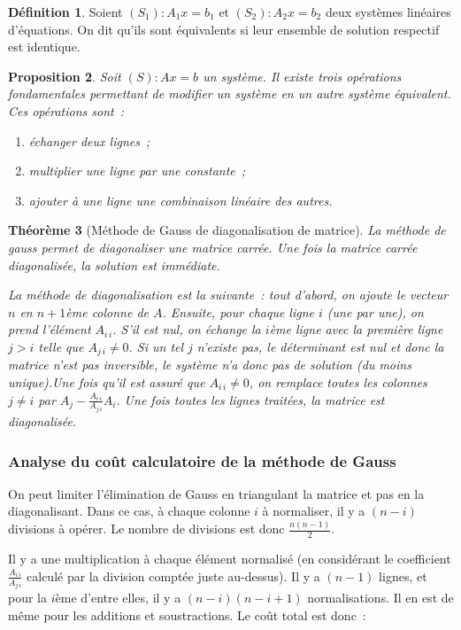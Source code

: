 \documentclass{article}
\newtheorem{thm}{Théorème}[section]
\newtheorem{prp}[thm]{Proposition}
\theoremstyle{definition}
\newtheorem{déf}[thm]{Définition}
\theoremstyle{remark}
\begin{document}
		\begin{déf} Soient $(S_1) : A_1x = b_1$ et $(S_2) : A_2x = b_2$ deux systèmes linéaires d'équations. On dit qu'ils sont équivalents si leur ensemble
		de solution respectif est identique. \end{déf}

		\begin{prp} Soit $(S) : Ax = b$ un système. Il existe trois opérations fondamentales permettant de modifier un système en un autre système équivalent.
		Ces opérations sont~:
		\begin{enumerate}
			\item échanger deux lignes~;
			\item multiplier une ligne par une constante~;
			\item ajouter à une ligne une combinaison linéaire des autres.
		\end{enumerate}
		\end{prp}

		\begin{thm}[Méthode de Gauss de diagonalisation de matrice] La méthode de gauss permet de diagonaliser une matrice carrée. Une fois la matrice carrée
		diagonalisée, la solution est immédiate.

		La méthode de diagonalisation est la suivante~: tout d'abord, on \emph{ajoute} le vecteur $n$ en $n+1$ème colonne de $A$. Ensuite, pour chaque ligne
		$i$ (une par une), on prend l'élément $A_{i\,i}$. S'il est nul, on échange la $i$ème ligne avec la première ligne $j > i$ telle que $A_{j\,i} \neq 0$.
		Si un tel $j$ n'existe pas, le déterminant est nul et donc la matrice n'est pas inversible, le système n'a donc pas de solution (du moins unique).Une
		fois qu'il est assuré que $A_{i\,i} \neq 0$, on remplace toutes les colonnes $j \neq i$ par $A_j - \frac {A_{i\,i}}{A_{j\,i}}A_i$. Une fois toutes les
		lignes traitées, la matrice est diagonalisée.
		\end{thm}

		\subsubsection{Analyse du coût calculatoire de la méthode de Gauss}
		On peut limiter l'élimination de Gauss en triangulant la matrice et pas en la diagonalisant. Dans ce cas, à chaque colonne $i$ à normaliser, il y a
		$(n-i)$ divisions à opérer. Le nombre de divisions est donc $\frac {n(n-1)}2$.

		Il y a une multiplication à chaque élément normalisé (en considérant le coefficient $\frac {A_{i\,i}}{A_{j\,i}}$ calculé par la division comptée juste
		au-dessus). Il y a $(n-1)$ lignes, et pour la $i$ème d'entre elles, il y a $(n-i)(n-i+1)$ normalisations. Il en est de même pour les additions et
		soustractions. Le coût total est donc~:
\end{document}
